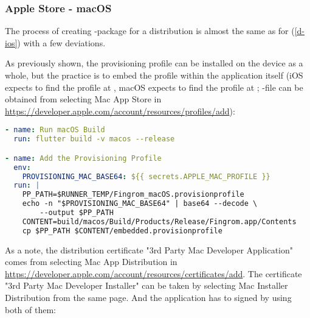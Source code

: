 
\subsubsection{Apple Store - macOS}

The process of creating -package for a distribution  is almost the same as for  
(\ref{d-ios}) with a few deviations.

As previously shown, the provisioning profile can be installed on the device as a whole, but the practice is to embed 
the profile within the application itself (iOS expects to find the profile at , 
macOS expects to find the profile at ; -file can 
be obtained from selecting Mac App Store in 
\href{https://developer.apple.com/account/resources/profiles/add}{https://developer.apple.com/account/resources/profiles/add}):

\begin{lstlisting}[language=yaml]
- name: Run macOS Build
  run: flutter build -v macos --release

- name: Add the Provisioning Profile
  env:
    PROVISIONING_MAC_BASE64: ${{ secrets.APPLE_MAC_PROFILE }}
  run: |
    PP_PATH=$RUNNER_TEMP/Fingrom_macOS.provisionprofile
    echo -n "$PROVISIONING_MAC_BASE64" | base64 --decode \
        --output $PP_PATH
    CONTENT=build/macos/Build/Products/Release/Fingrom.app/Contents
    cp $PP_PATH $CONTENT/embedded.provisionprofile
\end{lstlisting}


\noindent As a note, the distribution certificate "3rd Party Mac Developer Application" comes from selecting Mac App 
Distribution in
\href{https://developer.apple.com/account/resources/certificates/add}{https://developer.apple.com/account/resources/certificates/add}.
The certificate "3rd Party Mac Developer Installer" can be taken by selecting Mac Installer Distribution from the same 
page. And the application has to signed by using both of them:

